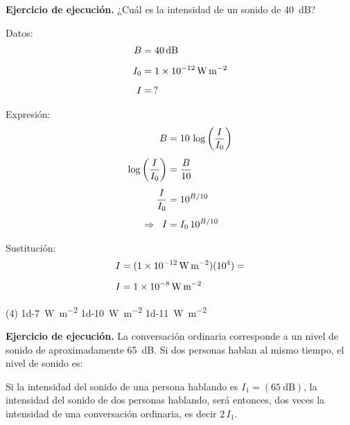 \documentclass[12pt, letter]{exam}
\begin{document}
\begin{questions}
    \setcounter{question}{8} \question \textbf{Ejercicio de ejecución.} ¿Cuál es la intensidad de un sonido de \SI{40}{\dB}?

    \begin{minipage}[t]{0.35\linewidth}
    Datos: 
    \begin{align*}
    B &= \SI{40}{\dB} \\[0.5em]
    I_{0} &= \SI{1d-12}{\watt\per\square\meter} \\[0.5em]
    I &= \, ?
    \end{align*}
    \end{minipage}
    \hspace{1cm}
    \begin{minipage}[t]{0.4\linewidth}
    Expresión:
    \begin{align*}
    B &= 10 \, \log \left( \dfrac{I}{I_{0}} \right)\\[0.4em]
    \log \left( \dfrac{I}{I_{0}} \right) &= \dfrac{B}{10} \\[0.4em]
    \dfrac{I}{I_{0}} &= 10^{B/10} \\[0.4em] 
    \Rightarrow \hspace*{0.2cm} I &= I_{0} \, 10^{B/10}
    \end{align*}
    \end{minipage}

    Sustitución:
    \begin{align*}
    I &= (\SI{1d-12}{\watt\per\square\meter})(10^{4}) = \\[0.5em]
    I &= \SI{1d-8}{\watt\per\square\meter}
    \end{align*}
    \begin{tasks}(4)
        \task \SI{1d-7}{\watt\per\square\meter}
        \task {}
        \task \SI{1d-10}{\watt\per\square\meter}
        \task \SI{1d-11}{\watt\per\square\meter}
    \end{tasks}
    \setcounter{question}{9} \question \textbf{Ejercicio de ejecución.} La conversación ordinaria corresponde a un nivel de sonido de aproximadamente \SI{65}{\dB}. Si dos personas hablan al mismo tiempo, el nivel de sonido es:

    \vspace{0.4cm}
    Si la intensidad del sonido de una persona hablando es $I_{1} = (\SI{65}{\dB})$, la intensidad del sonido de dos personas hablando, será entonces, dos veces la intensidad de una conversación ordinaria, es decir $2 \, I_{1}$.


\end{questions}
\end{document}
